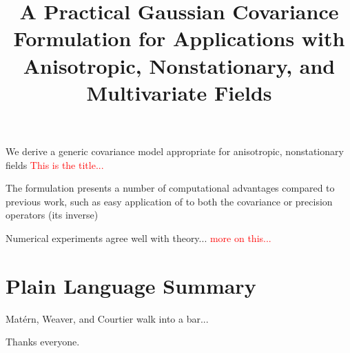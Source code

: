 \documentclass[draft]{Feb-3-22-latex-templates/agujournal2019}
\newcommand{\red}[1]{\textcolor{red}{#1}}
\begin{document}
\title{A Practical Gaussian Covariance Formulation for Applications with
       Anisotropic, Nonstationary, and Multivariate Fields}


\begin{keypoints}
    \item We derive a generic covariance model appropriate for anisotropic,
        nonstationary fields \red{This is the title...}
    \item The formulation presents a number of computational advantages compared
        to previous work, such as easy application of to both the covariance or
        precision operators (its inverse)
    \item Numerical experiments agree well with theory... \red{more on this...}
\end{keypoints}

\begin{abstract}
\end{abstract}

\section*{Plain Language Summary}
Mat\'ern, Weaver, and Courtier walk into a bar...













\appendix


\acknowledgments
Thanks everyone.


\end{document}
